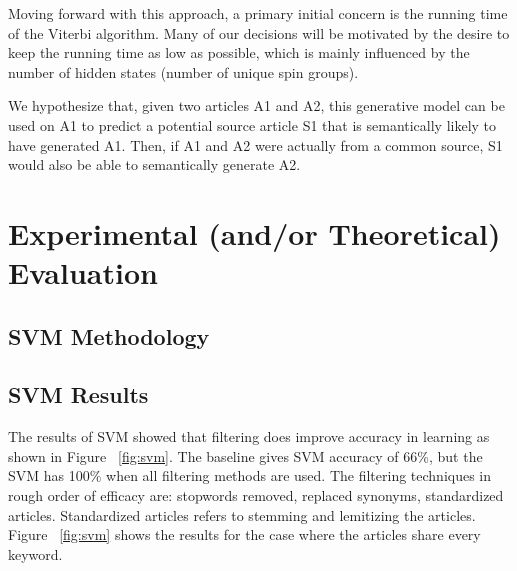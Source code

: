 \documentclass[11pt,letterpaper,oneside, titlepage]{scrartcl}
\begin{document}
Moving forward with this approach, a primary initial concern is the running time of the Viterbi algorithm. Many of our decisions will be motivated by the desire to keep the running time as low as possible, which is mainly influenced by the number of hidden states (number of unique spin groups).

We hypothesize that, given two articles A1 and A2, this generative model can be used on A1 to predict a potential source article S1 that is semantically likely to have generated A1. Then, if A1 and A2 were actually from a common source, S1 would also be able to semantically generate A2.


\section{Experimental (and/or Theoretical) Evaluation }



\subsection{SVM Methodology}





\subsection{SVM Results}


The results of SVM showed that filtering does improve accuracy in learning as shown in Figure ~\ref{fig:svm}. The baseline gives SVM accuracy of 66\%, but the SVM has 100\% when all filtering methods are used. The filtering techniques in rough order of efficacy are: stopwords removed, replaced synonyms, standardized articles. Standardized articles refers to stemming and lemitizing the articles. Figure ~\ref{fig:svm} shows the results for the case where the articles share every keyword.
\end{document}
